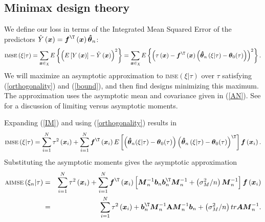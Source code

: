 \documentclass[times, authoryear, 12pt, twoside]{elsarticle}
\begin{document}
\subsection{Minimax design theory \label{section: minimax theory}}

We define our loss in terms of the Integrated Mean Squared Error of the
predictors $\hat{Y}\left( \boldsymbol{x}\right) =\boldsymbol{f}^{\T
}\left( \boldsymbol{x}\right) \boldsymbol{\hat{\theta}}_{n}$: 
\begin{equation}
\text{\textsc{imse}}\left( \xi |\tau \right) =\sum_{\boldsymbol{x}\mathbb{
\in }\chi}E\left\{ \left( E\left[ Y\left( \boldsymbol{x}\right) %
\right] -\hat{Y}\left( \boldsymbol{x}\right) \right) ^{2}\right\} =\sum_{%
\boldsymbol{x}\mathbb{\in }\chi}E\left\{ \left( \tau \left( 
\boldsymbol{x}\right) -\boldsymbol{f}^{\T }\left( \boldsymbol{x}\right)
\left( \boldsymbol{\hat{\theta}}_{n}\left( \xi |\tau \right) -\boldsymbol{\theta }_{0}(\tau)%
\right) \right) ^{2}\right\} .  \label{IM}
\end{equation}%
We will maximize an asymptotic approximation to \textsc{imse}$\left( \xi |\tau \right) $ over $\tau $
satisfying (\ref{orthogonality}) and (\ref{bound}), and then find designs
minimizing this maximum. The approximation uses the asymptotic mean and covariance given in (\ref{AN}). See \cite{l99} for a discussion of limiting versus asymptotic moments. 

Expanding (\ref{IM}) and using (\ref{orthogonality}) results
in 
\begin{equation}
\text{\textsc{imse}}\left( \xi|\tau \right)=\sum_{i=1}^{N}\tau ^{2}\left( \boldsymbol{x}%
_{i}\right) +\sum_{i=1}^{N}\boldsymbol{f}^{\T }\left( \boldsymbol{x}%
_{i}\right) E\left[ \left( \boldsymbol{\hat{\theta}}_{n}(\xi|\tau)-\boldsymbol{\theta }%
_{0}(\tau)\right)\left( \boldsymbol{\hat{\theta}}_{n}\left( \xi |\tau \right) -\boldsymbol{\theta }_{0}(\tau)%
%
\right) ^{\T }\right] \boldsymbol{f}\left( \boldsymbol{x}_{i}\right).
\notag 
\end{equation}
Substituting the asymptotic moments gives the asymptotic approximation
\begin{eqnarray}
\text{\textsc{aimse}}\left( \xi_n |\tau \right)&=&\sum_{i=1}^{N}\tau ^{2}\left( \boldsymbol{x}_{i}\right) +\sum_{i=1}^{N}%
\boldsymbol{f}^{\T }\left( \boldsymbol{x}_{i}\right) \left[ \boldsymbol{M%
}_{n}^{-1}\boldsymbol{b}_{n}\boldsymbol{b}_{n}^{\T }\boldsymbol{M}%
_{n}^{-1}+\left( \sigma _{M}^{2}/n\right) \boldsymbol{M}_{n}^{-1}\right] 
\boldsymbol{f}\left( \boldsymbol{x}_{i}\right) \notag
\\
&=&\sum_{i=1}^{N}\tau ^{2}\left( \boldsymbol{x}_{i}\right) +\boldsymbol{b}%
_{n}^{\T }\boldsymbol{M}_{n}^{-1}\mathbf{A}\boldsymbol{M}_{n}^{-1}%
\boldsymbol{b}_{n}+\left( \sigma _{M}^{2}/n\right) tr\boldsymbol{AM}%
_{n}^{-1} \text{.}  \label{IMSEn}
\end{eqnarray}
\end{document}
